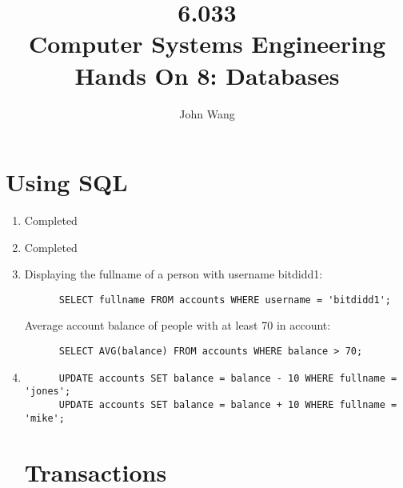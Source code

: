 \documentclass[psamsfonts]{amsart}
\title{6.033 \\
Computer Systems Engineering \\
Hands On 8: Databases}
\author{John Wang}
\begin{document}
\maketitle

\section{Using SQL}

\begin{enumerate}
  \item Completed
  \item Completed
  \item Displaying the fullname of a person with username bitdidd1:
    \begin{verbatim}
      SELECT fullname FROM accounts WHERE username = 'bitdidd1';
    \end{verbatim}

    Average account balance of people with at least 70 in account:
    \begin{verbatim}
      SELECT AVG(balance) FROM accounts WHERE balance > 70;
    \end{verbatim}

  \item 
    \begin{verbatim}
      UPDATE accounts SET balance = balance - 10 WHERE fullname = 'jones';
      UPDATE accounts SET balance = balance + 10 WHERE fullname = 'mike';
    \end{verbatim}

    \section{Transactions}


\end{enumerate}
\end{document}
